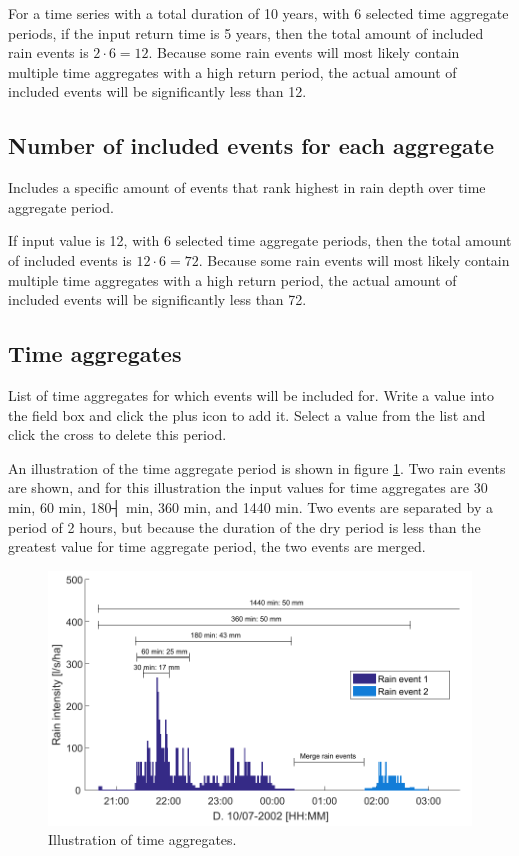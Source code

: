 \documentclass[a4paper,11pt]{refart}
\begin{document}
For a time series with a total duration of 10 years, with 6 selected time aggregate periods, if the input return time is 5 years, then the total amount of included rain events is $2\cdot 6 = 12$. Because some rain events will most likely contain multiple time aggregates with a high return period, the actual amount of included events will be significantly less than 12.
		\subsection{Number of included events for each aggregate}
		Includes a specific amount of events that rank highest in rain depth over time aggregate period. 
		
		If input value is 12, with 6 selected time aggregate periods, then the total amount of included events is $12\cdot 6 = 72$. Because some rain events will most likely contain multiple time aggregates with a high return period, the actual amount of included events will be significantly less than 72.
		
		\subsection{Time aggregates}
		List of time aggregates for which events will be included for. Write a value into the field box and click the plus icon to add it. Select a value from the list and click the cross to delete this period. 
		
		An illustration of the time aggregate period is shown in figure \ref{fig:RainEventPatterns}. Two rain events are shown, and for this illustration the input values for time aggregates are 30 min, 60 min, 180┤ min, 360 min, and 1440 min. Two events are separated by a period of 2 hours, but because the duration of the dry period is less than the greatest value for time aggregate period, the two events are merged. 
		\begin{figure}[H]\centering
			\includegraphics[scale=0.7]{RainEventPatterns.pdf}
			\caption{Illustration of time aggregates.}\label{fig:RainEventPatterns}
		\end{figure}
\end{document}
